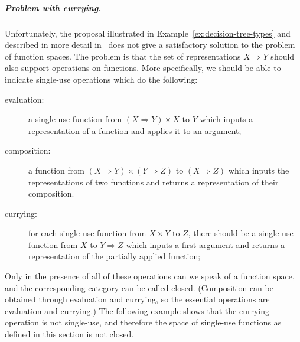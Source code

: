 \subparagraph{Problem with currying.}
Unfortunately, the proposal illustrated in Example~\ref{ex:decision-tree-types} and described in more detail in~\cite{stefanski-phd}  does not give a satisfactory solution to the problem of function spaces. The problem is that the set of representations $X \Rightarrow Y$ should  also support operations on functions. More specifically, we should be able to indicate single-use operations which do the following:
\begin{description}
    \item[evaluation:] a single-use function from $(X \Rightarrow Y) \times X$ to $Y$ which inputs a representation of a function and applies it to an argument;
    \item[composition:] a function from $(X \Rightarrow Y) \times (Y \Rightarrow Z)$ to $(X \Rightarrow Z)$ which inputs the representations of two functions and returns a representation of their composition.
    \item[currying:] for each single-use function from  $ X \times Y $ to $Z$, there should be a single-use function from $X$ to $Y \Rightarrow Z$ which inputs a first argument and returns a representation of the  partially applied function;
\end{description}
Only in the presence of all of these operations can we speak of a function space, and the corresponding category can be called closed. (Composition can be obtained through evaluation and currying, so the essential operations are evaluation and currying.) The following example shows that the currying operation is not single-use, and therefore the space of single-use functions as defined in this section is not closed.


